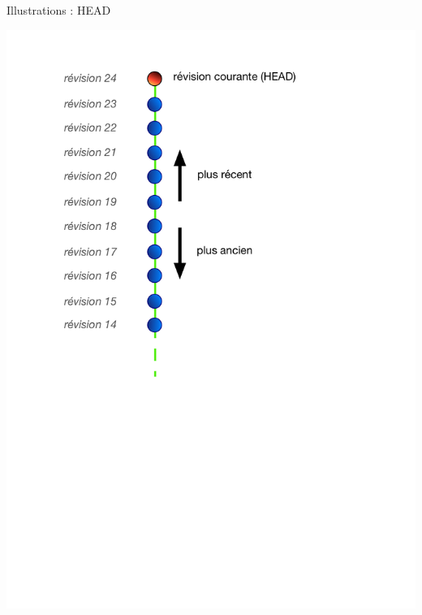 \begin{frame}{%
\protect\hypertarget{illustrations-head}{%
Illustrations : HEAD}}

\includegraphics[height=1\textwidth]{images/head.pdf}

\end{frame}

